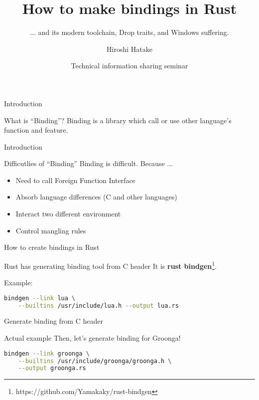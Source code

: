 \documentclass[12pt, unicode]{beamer}
\title{How to make bindings in Rust}
\subtitle{... and its modern toolchain, Drop traits, and Windows suffering.}
\author{Hiroshi Hatake}
\date[2016/04/08]{Technical information sharing seminar}
\begin{document}
\frame{\maketitle}

\begin{frame}{Introduction}
\begin{block}{What is ``Binding''?}
Binding is a library which call or use other language's function and feature.
\end{block}
\end{frame}

\begin{frame}{Introduction}
\begin{block}{Difficutlies of ``Binding''}
Binding is difficult. Because ...
\end{block}
\begin{itemize}
\item<2-> Need to call Foreign Function Interface
\item<3-> Absorb language differences (C and other languages)
\item<4-> Interact two different environment
\item<5-> Control mangling rules
\end{itemize}
\end{frame}

\newcommand\Small{\fontsize{9}{9.2}\selectfont}
\begin{frame}[fragile]{How to create bindings in Rust}
\begin{block}{Rust has generating binding tool from C header}
It is \textbf {rust bindgen}\footnote[frame]{https://github.com/Yamakaky/rust-bindgen}.
\end{block}
{\large Example:}
\begin{lstlisting}[language={bash},basicstyle=\ttfamily\Small]
  bindgen --link lua \
    --builtins /usr/include/lua.h --output lua.rs
\end{lstlisting}
\end{frame}

\begin{frame}[fragile]{Generate binding from C header}
\begin{block}{Actual example}
Then, let's generate binding for Groonga!
\end{block}
\begin{lstlisting}[language={bash},basicstyle=\ttfamily\Small]
  bindgen --link groonga \
    --builtins /usr/include/groonga/groonga.h \
    --output groonga.rs
\end{lstlisting}
\end{frame}
\end{document}
